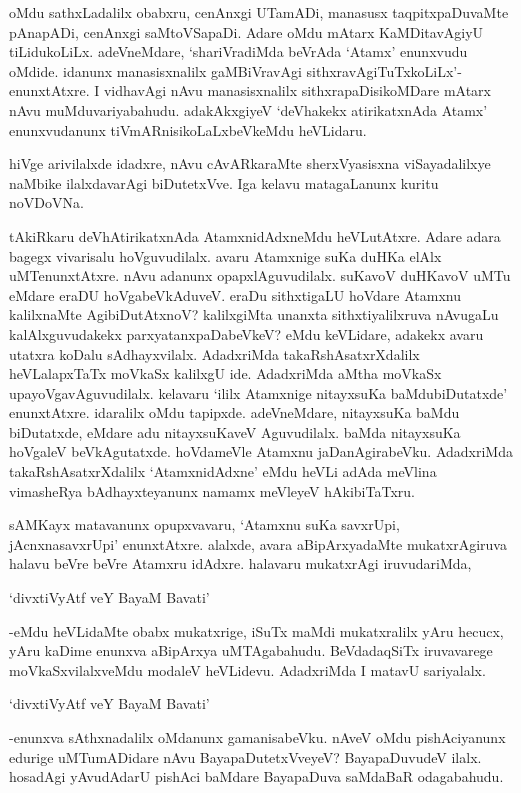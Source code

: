 oMdu sathxLadalilx obabxru, cenAnxgi UTamADi, manasusx taqpitxpaDuvaMte pAnapADi, cenAnxgi saMtoVSapaDi. Adare oMdu mAtarx KaMDitavAgiyU tiLidukoLiLx. adeVneMdare, `shariVradiMda beVrAda `Atamx' enunxvudu oMdide. idanunx manasisxnalilx gaMBiVravAgi sithxravAgiTuTxkoLiLx'-enunxtAtxre. I vidhavAgi nAvu manasisxnalilx sithxrapaDisikoMDare mAtarx nAvu muMduvariyabahudu. adakAkxgiyeV `deVhakekx atirikatxnAda Atamx' enunxvudanunx tiVmARnisikoLaLxbeVkeMdu heVLidaru.

hiVge arivilalxde idadxre, nAvu cAvARkaraMte sherxVyasisxna viSayadalilxye naMbike ilalxdavarAgi biDutetxVve. Iga kelavu matagaLanunx kuritu noVDoVNa.

tAkiRkaru deVhAtirikatxnAda AtamxnidAdxneMdu heVLutAtxre. Adare adara bagegx vivarisalu hoVguvudilalx. avaru Atamxnige suKa duHKa elAlx uMTenunxtAtxre. nAvu adanunx opapxlAguvudilalx. suKavoV duHKavoV uMTu eMdare eraDU hoVgabeVkAduveV. eraDu sithxtigaLU hoVdare Atamxnu kalilxnaMte AgibiDutAtxnoV? kalilxgiMta unanxta sithxtiyalilxruva nAvugaLu kalAlxguvudakekx parxyatanxpaDabeVkeV? eMdu keVLidare, adakekx avaru utatxra koDalu sAdhayxvilalx. AdadxriMda takaRshAsatxrXdalilx heVLalapxTaTx moVkaSx kalilxgU ide. AdadxriMda aMtha moVkaSx upayoVgavAguvudilalx. kelavaru `ililx Atamxnige nitayxsuKa baMdubiDutatxde' enunxtAtxre. idaralilx oMdu tapipxde. adeVneMdare, nitayxsuKa baMdu biDutatxde, eMdare adu nitayxsuKaveV Aguvudilalx. baMda nitayxsuKa hoVgaleV beVkAgutatxde. hoVdameVle Atamxnu jaDanAgirabeVku. AdadxriMda takaRshAsatxrXdalilx `AtamxnidAdxne' eMdu heVLi adAda meVlina vimasheRya bAdhayxteyanunx namamx meVleyeV hAkibiTaTxru. 

sAMKayx matavanunx opupxvavaru, `Atamxnu suKa savxrUpi, jAcnxnasavxrUpi' enunxtAtxre. alalxde, avara aBipArxyadaMte mukatxrAgiruva halavu beVre beVre Atamxru idAdxre. halavaru mukatxrAgi iruvudariMda,

\begin{shloka}
`divxtiVyAtf veY BayaM Bavati'
\end{shloka}

-eMdu heVLidaMte obabx mukatxrige, iSuTx maMdi mukatxralilx yAru hecucx, yAru kaDime enunxva aBipArxya uMTAgabahudu. BeVdadaqSiTx iruvavarege moVkaSxvilalxveMdu modaleV heVLidevu. AdadxriMda I matavU sariyalalx.

\begin{shloka}
`divxtiVyAtf veY BayaM Bavati'
\end{shloka}

-enunxva sAthxnadalilx oMdanunx gamanisabeVku. nAveV oMdu pishAciyanunx edurige uMTumADidare nAvu BayapaDutetxVveyeV? BayapaDuvudeV ilalx. hosadAgi yAvudAdarU pishAci baMdare BayapaDuva saMdaBaR odagabahudu.

